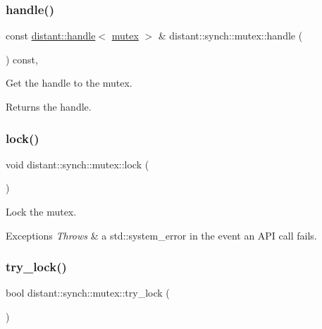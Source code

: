 \subsubsection{\texorpdfstring{handle()}{handle()}}
{\footnotesize\ttfamily const \mbox{\hyperlink{classdistant_1_1handle}{distant\+::handle}}$<$ \mbox{\hyperlink{classdistant_1_1synch_1_1mutex}{mutex}} $>$ \& distant\+::synch\+::mutex\+::handle (\begin{DoxyParamCaption}{ }\end{DoxyParamCaption}) const\hspace{0.3cm}{\ttfamily [inline]}, {\ttfamily [noexcept]}}



Get the handle to the mutex. 

\begin{DoxyReturn}{Returns}
the handle. 
\end{DoxyReturn}
\mbox{\label{classdistant_1_1synch_1_1mutex_a1a37630c7ff5ae38d76f408a56ec4e92}} 
\subsubsection{\texorpdfstring{lock()}{lock()}}
{\footnotesize\ttfamily void distant\+::synch\+::mutex\+::lock (\begin{DoxyParamCaption}{ }\end{DoxyParamCaption})\hspace{0.3cm}{\ttfamily [inline]}}



Lock the mutex. 


\begin{DoxyExceptions}{Exceptions}
{\em Throws} & a std\+::system\+\_\+error in the event an A\+PI call fails. \\
\hline
\end{DoxyExceptions}
\mbox{\label{classdistant_1_1synch_1_1mutex_acea5e3450dfd9227185a55f558f4d024}} 
\subsubsection{\texorpdfstring{try\+\_\+lock()}{try\_lock()}}
{\footnotesize\ttfamily bool distant\+::synch\+::mutex\+::try\+\_\+lock (\begin{DoxyParamCaption}{ }\end{DoxyParamCaption})\hspace{0.3cm}{\ttfamily [inline]}}



